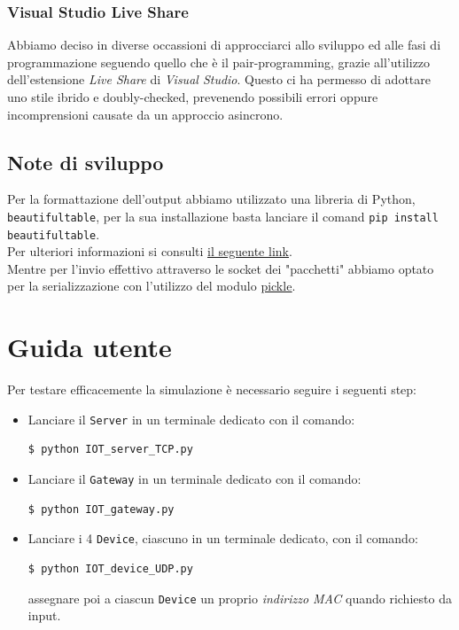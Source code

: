 \documentclass[a4paper,12pt]{report}
\begin{document}
\subsection{Visual Studio Live Share}
Abbiamo deciso in diverse occassioni di approcciarci allo sviluppo ed alle fasi di programmazione seguendo quello che è il pair-programming, grazie all'utilizzo dell'estensione \textit{Live Share} di \textit{Visual Studio}. Questo ci ha permesso di adottare uno stile ibrido e doubly-checked, prevenendo possibili errori oppure incomprensioni causate da un approccio asincrono.

\section{Note di sviluppo}
Per la formattazione dell'output abbiamo utilizzato una libreria di Python,
\texttt{beautifultable}, per la sua installazione basta lanciare il comand \texttt{pip install beautifultable}.\\
Per ulteriori informazioni si consulti \href{https://pypi.org/project/beautifultable/}{\underline{il seguente link}}.\\
Mentre per l'invio effettivo attraverso le socket dei "pacchetti" abbiamo optato per la serializzazione con l'utilizzo del modulo \href{https://docs.python.org/3/library/pickle.html}{\underline{pickle}}.
\appendix

\chapter{Guida utente}
Per testare efficacemente la simulazione è necessario seguire i seguenti step:
\begin{itemize}
    \item Lanciare il \texttt{Server} in un terminale dedicato con il comando:
        \begin{lstlisting}[language=bash]
            $ python IOT_server_TCP.py
        \end{lstlisting}
    \item Lanciare il \texttt{Gateway} in un terminale dedicato con il comando:
        \begin{lstlisting}[language=bash]
            $ python IOT_gateway.py
        \end{lstlisting}
    \item Lanciare i 4 \texttt{Device}, ciascuno in un terminale dedicato, con il comando:
        \begin{lstlisting}[language=bash]
            $ python IOT_device_UDP.py
        \end{lstlisting}
        assegnare poi a ciascun \texttt{Device} un proprio \textit{indirizzo MAC} quando richiesto da input.
\end{itemize}
\end{document}
